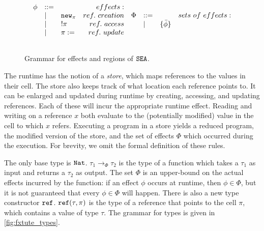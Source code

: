 \begin{figure}[h]

\[
\begin{array}{c}

\begin{array}{lllr}

\phi & ::= & ~ & effects: \\
	& | & \mathtt{new}_{\pi} & ref.~creation\\
	& | & !\pi & ref.~access \\
	& | & \pi := & ref.~update \\
	&&\\
	
\end{array}
	
\begin{array}{lllr}

\Phi & ::= & ~ & sets~of~effects: \\
	& | & \{ \bar \phi \} \\
	&&\\
	
\end{array}
	
\end{array}
\]

\vspace{-12pt}
\caption{Grammar for effects and regions of $\mathtt{SEA}$.}
\label{fig:fxtute_fx_regions}
\end{figure}

The runtime has the notion of a \textit{store}, which maps references to the values in their cell. The store also keeps track of what location each reference points to. It can be enlarged and updated during runtime by creating, accessing, and updating references. Each of these will incur the appropriate runtime effect. Reading and writing on a reference $x$ both evaluate to the (potentially modified) value in the cell to which $x$ refers. Executing a program in a store yields a reduced program, the modified version of the store, and the set of effects $\Phi$ which occurred during the execution. For brevity, we omit the formal definition of these rules.

The only base type is $\mathtt{Nat}$. $\tau_1 \rightarrow_{\Phi} \tau_2$ is the type of a function which takes a $\tau_1$ as input and returns a $\tau_2$ as output. The set $\Phi$ is an upper-bound on the actual effects incurred by the function: if an effect $\phi$ occurs at runtime, then $\phi \in \Phi$, but it is not guaranteed that every $\phi \in \Phi$ will happen. There is also a new type constructor $\mathtt{ref}$. $\mathtt{ref}(\tau, \pi)$ is the type of a reference that points to the cell $\pi$, which contains a value of type $\tau$. The grammar for types is given in \ref{fig:fxtute_types}.

